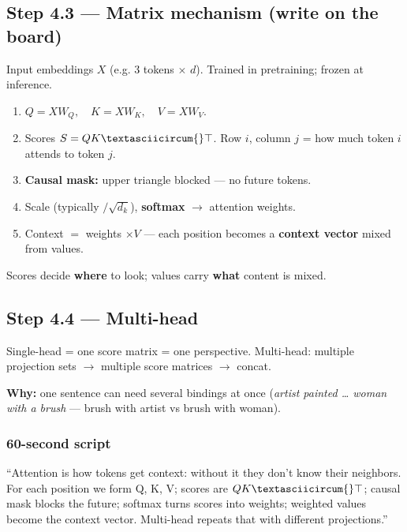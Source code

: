 \documentclass[11pt,a4paper]{article}
\begin{document}
\subsection{Step 4.3 --- Matrix mechanism (write on the board)}


Input embeddings \(X\) (e.g. 3 tokens $\times$ \(d\)). Trained in pretraining; frozen at inference.


\begin{enumerate}
\item \(Q = X W_Q,\quad K = X W_K,\quad V = X W_V\).  
\item Scores \(S = Q K\textasciicircum{}\top\). Row \(i\), column \(j\) = how much token \(i\) attends to token \(j\).  
\item \textbf{Causal mask:} upper triangle blocked --- no future tokens.  
\item Scale (typically \(/\sqrt{d_k}\)), \textbf{softmax} $\rightarrow$ attention weights.  
\item Context \(=\) weights \(\times V\) --- each position becomes a \textbf{context vector} mixed from values.
\end{enumerate}


Scores decide \textbf{where} to look; values carry \textbf{what} content is mixed.


\subsection{Step 4.4 --- Multi-head}


Single-head = one score matrix = one perspective.   Multi-head: multiple projection sets $\rightarrow$ multiple score matrices $\rightarrow$ concat.


\textbf{Why:} one sentence can need several bindings at once (\textit{artist painted \ldots{} woman with a brush} --- brush with artist vs brush with woman).


\subsubsection{60-second script}

``Attention is how tokens get context: without it they don't know their neighbors. For each position we form Q, K, V; scores are \(QK\textasciicircum{}\top\); causal mask blocks the future; softmax turns scores into weights; weighted values become the context vector. Multi-head repeats that with different projections.''


\bigskip
\end{document}

